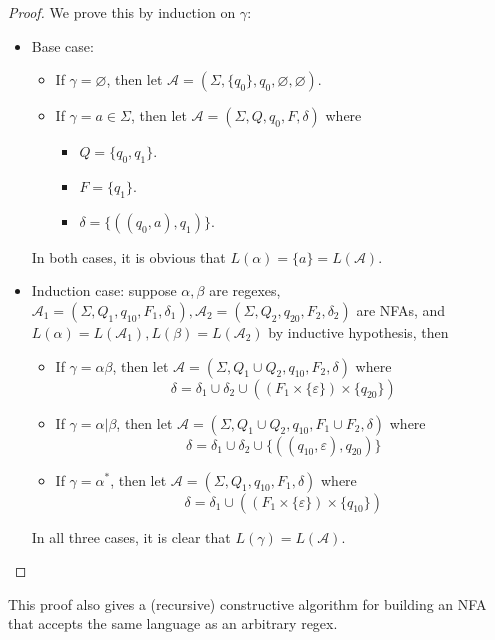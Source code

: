 \documentclass[titlepage]{article}
\theoremstyle{plain}
\theoremstyle{definition}
\theoremstyle{remark}
\begin{document}
\begin{proof}
  We prove this by induction on $\gamma$:
  \begin{itemize}
    \item Base case:
      \begin{itemize}
        \item If $\gamma=\varnothing$, then let $\mathcal{A}=(\Sigma,\{q_0\},
          q_0,\varnothing,\varnothing)$.
        \item If $\gamma=a\in\Sigma$, then let $\mathcal{A}=(\Sigma,Q,q_0,F,
          \delta)$ where
          \begin{itemize}
            \item $Q=\{q_0,q_1\}$.
            \item $F=\{q_1\}$.
            \item $\delta=\{((q_0,a),q_1)\}$.
          \end{itemize}
      \end{itemize}
      In both cases, it is obvious that $L(\alpha)=\{a\}=L(\mathcal{A})$.
    \item Induction case: suppose $\alpha,\beta$ are regexes, $\mathcal{A}_1
      =(\Sigma,Q_1,q_{10},F_1,\delta_1), \mathcal{A}_2=(\Sigma,Q_2,q_{20},F_2,
      \delta_2)$ are NFAs, and $L(\alpha)=L(\mathcal{A}_1),L(\beta)=
      L(\mathcal{A}_2)$ by inductive hypothesis, then
      \begin{itemize}
        \item If $\gamma=\alpha\beta$, then let $\mathcal{A}=(\Sigma,
          Q_1\cup Q_2,q_{10},F_2,\delta)$ where
          \[
            \delta=\delta_1\cup\delta_2\cup((F_1\times\{\varepsilon\})
            \times\{q_{20}\})
          \]
        \item If $\gamma=\alpha|\beta$, then let $\mathcal{A}=(\Sigma,
          Q_1\cup Q_2,q_{10},F_1\cup F_2,\delta)$ where
          \[
            \delta=\delta_1\cup\delta_2\cup\{((q_{10},\varepsilon),q_{20})\}
          \]
        \item If $\gamma=\alpha^*$, then let $\mathcal{A}=(\Sigma,
          Q_1,q_{10},F_1,\delta)$ where
          \[
            \delta=\delta_1\cup((F_1\times\{\varepsilon\})\times\{q_{10}\})
          \]
      \end{itemize}
      In all three cases, it is clear that $L(\gamma)=L(\mathcal{A})$.
  \end{itemize}
\end{proof}
This proof also gives a (recursive) constructive algorithm for building an
NFA that accepts the same language as an arbitrary regex.
\end{document}
